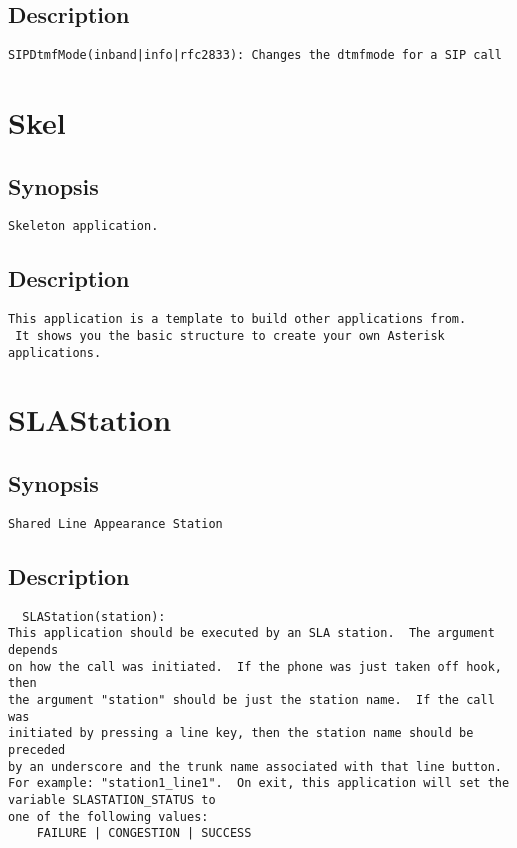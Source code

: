 \subsection{Description}
\begin{verbatim}
SIPDtmfMode(inband|info|rfc2833): Changes the dtmfmode for a SIP call

\end{verbatim}


\section{Skel}
\subsection{Synopsis}
\begin{verbatim}
Skeleton application.
\end{verbatim}
\subsection{Description}
\begin{verbatim}
This application is a template to build other applications from.
 It shows you the basic structure to create your own Asterisk applications.

\end{verbatim}


\section{SLAStation}
\subsection{Synopsis}
\begin{verbatim}
Shared Line Appearance Station
\end{verbatim}
\subsection{Description}
\begin{verbatim}
  SLAStation(station):
This application should be executed by an SLA station.  The argument depends
on how the call was initiated.  If the phone was just taken off hook, then
the argument "station" should be just the station name.  If the call was
initiated by pressing a line key, then the station name should be preceded
by an underscore and the trunk name associated with that line button.
For example: "station1_line1".  On exit, this application will set the variable SLASTATION_STATUS to
one of the following values:
    FAILURE | CONGESTION | SUCCESS

\end{verbatim}


